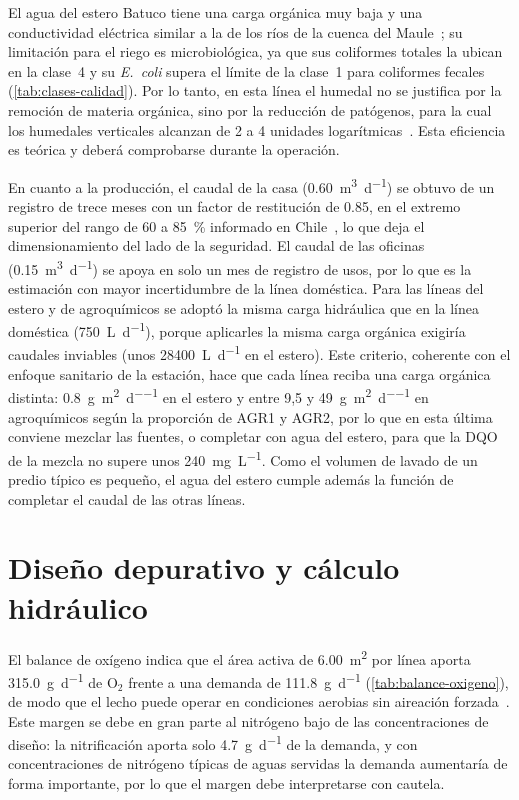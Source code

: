 El agua del estero Batuco tiene una carga orgánica muy baja y una conductividad eléctrica similar a la de los ríos de la cuenca del Maule~\parencite{dga2004volumen1}; su limitación para el riego es microbiológica, ya que sus coliformes totales la ubican en la clase~4 y su \textit{E.~coli} supera el límite de la clase~1 para coliformes fecales (\cref{tab:clases-calidad}).
Por lo tanto, en esta línea el humedal no se justifica por la remoción de materia orgánica, sino por la reducción de patógenos, para la cual los humedales verticales alcanzan de 2 a 4 unidades logarítmicas~\parencite{langergraber2021vertical}.
Esta eficiencia es teórica y deberá comprobarse durante la operación.

En cuanto a la producción, el caudal de la casa (\qty{0.60}{\cubic\meter\per\day}) se obtuvo de un registro de trece meses con un factor de restitución de \num{0.85}, en el extremo superior del rango de 60 a \qty{85}{\percent} informado en Chile~\parencite{vidal2023desarrollo}, lo que deja el dimensionamiento del lado de la seguridad.
El caudal de las oficinas (\qty{0.15}{\cubic\meter\per\day}) se apoya en solo un mes de registro de usos, por lo que es la estimación con mayor incertidumbre de la línea doméstica.
Para las líneas del estero y de agroquímicos se adoptó la misma carga hidráulica que en la línea doméstica (\qty{750}{\liter\per\day}), porque aplicarles la misma carga orgánica exigiría caudales inviables (unos \qty{28400}{\liter\per\day} en el estero).
Este criterio, coherente con el enfoque sanitario de la estación, hace que cada línea reciba una carga orgánica distinta: \qty{0.8}{\gram\per\square\meter\per\day} en el estero y entre 9,5 y \qty{49}{\gram\per\square\meter\per\day} en agroquímicos según la proporción de AGR1 y AGR2, por lo que en esta última conviene mezclar las fuentes, o completar con agua del estero, para que la DQO de la mezcla no supere unos \qty{240}{\milli\gram\per\liter}.
Como el volumen de lavado de un predio típico es pequeño, el agua del estero cumple además la función de completar el caudal de las otras líneas.

\section{Diseño depurativo y cálculo hidráulico}
\label{sec:dis-hidraulico}

El balance de oxígeno indica que el área activa de \qty{6.00}{\square\meter} por línea aporta \qty{315.0}{\gram\per\day} de O$_2$ frente a una demanda de \qty{111.8}{\gram\per\day} (\cref{tab:balance-oxigeno}), de modo que el lecho puede operar en condiciones aerobias sin aireación forzada~\parencite{platzer1999design,dotro2021humedales}.
Este margen se debe en gran parte al nitrógeno bajo de las concentraciones de diseño: la nitrificación aporta solo \qty{4.7}{\gram\per\day} de la demanda, y con concentraciones de nitrógeno típicas de aguas servidas la demanda aumentaría de forma importante, por lo que el margen debe interpretarse con cautela.

